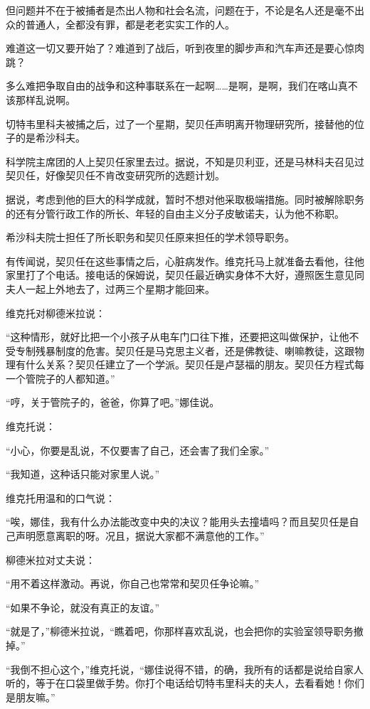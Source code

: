 但问题并不在于被捕者是杰出人物和社会名流，问题在于，不论是名人还是毫不出众的普通人，全都没有罪，都是老老实实工作的人。

难道这一切又要开始了？难道到了战后，听到夜里的脚步声和汽车声还是要心惊肉跳？

多么难把争取自由的战争和这种事联系在一起啊……是啊，是啊，我们在喀山真不该那样乱说啊。

切特韦里科夫被捕之后，过了一个星期，契贝任声明离开物理研究所，接替他的位子的是希沙科夫。

科学院主席团的人上契贝任家里去过。据说，不知是贝利亚，还是马林科夫召见过契贝任，好像契贝任不肯改变研究所的选题计划。

据说，考虑到他的巨大的科学成就，暂时不想对他采取极端措施。同时被解除职务的还有分管行政工作的所长、年轻的自由主义分子皮敏诺夫，认为他不称职。

希沙科夫院士担任了所长职务和契贝任原来担任的学术领导职务。

有传闻说，契贝任在这些事情之后，心脏病发作。维克托马上就准备去看他，往他家里打了个电话。接电话的保姆说，契贝任最近确实身体不大好，遵照医生意见同夫人一起上外地去了，过两三个星期才能回来。

维克托对柳德米拉说：

“这种情形，就好比把一个小孩子从电车门口往下推，还要把这叫做保护，让他不受专制残暴制度的危害。契贝任是马克思主义者，还是佛教徒、喇嘛教徒，这跟物理有什么关系？契贝任建立了一个学派。契贝任是卢瑟福的朋友。契贝任方程式每一个管院子的人都知道。”

“哼，关于管院子的，爸爸，你算了吧。”娜佳说。

维克托说：

“小心，你要是乱说，不仅要害了自己，还会害了我们全家。”

“我知道，这种话只能对家里人说。”

维克托用温和的口气说：

“唉，娜佳，我有什么办法能改变中央的决议？能用头去撞墙吗？而且契贝任是自己声明愿意离职的呀。况且，据说大家都不满意他的工作。”

柳德米拉对丈夫说：

“用不着这样激动。再说，你自己也常常和契贝任争论嘛。”

“如果不争论，就没有真正的友谊。”

“就是了，”柳德米拉说，“瞧着吧，你那样喜欢乱说，也会把你的实验室领导职务撤掉。”

“我倒不担心这个，”维克托说，“娜佳说得不错，的确，我所有的话都是说给自家人听的，等于在口袋里做手势。你打个电话给切特韦里科夫的夫人，去看看她！你们是朋友嘛。”


